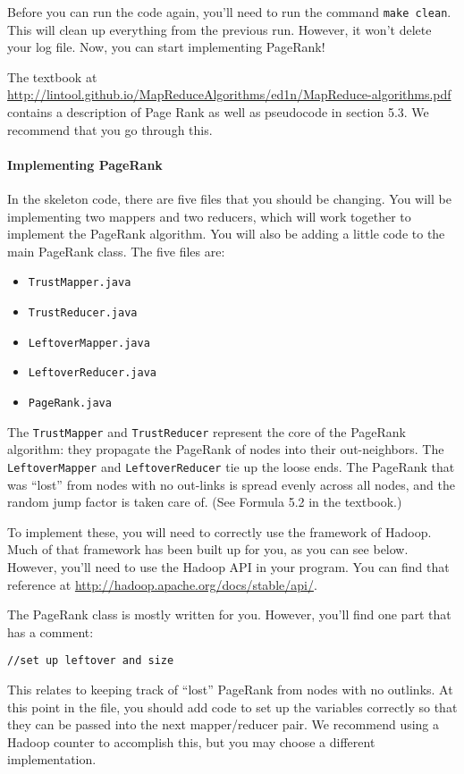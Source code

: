 \documentclass[10pt]{article}
\begin{document}
Before you can run the code again, you'll need to run the command \texttt{make clean}. This will clean up everything from the previous run. However, it won't delete your log file.
Now, you can start implementing PageRank!

The textbook at \url{http://lintool.github.io/MapReduceAlgorithms/ed1n/MapReduce-algorithms.pdf} contains a description of  Page Rank as well as pseudocode in section 5.3. We recommend that you go through this.

\paragraph{Implementing PageRank}
In the skeleton code, there are five files that you should be changing. You will be implementing two mappers and two reducers, which will work together to implement the PageRank algorithm. You will also be adding a little code to the main PageRank class. The five files are:
\begin{itemize}
	\item \texttt{TrustMapper.java}
	\item \texttt{TrustReducer.java}
	\item \texttt{LeftoverMapper.java}
	\item \texttt{LeftoverReducer.java}
	\item \texttt{PageRank.java}
\end{itemize}

The \texttt{TrustMapper} and \texttt{TrustReducer} represent the core of the PageRank algorithm: they propagate the PageRank of nodes into their out-neighbors. The \texttt{LeftoverMapper} and \texttt{LeftoverReducer} tie up the loose ends. The PageRank that was “lost” from nodes with no out-links is spread evenly across all nodes, and the random jump factor is taken care of. (See Formula 5.2 in the textbook.)

To implement these, you will need to correctly use the framework of Hadoop. Much of that framework has been built up for you, as you can see below. However, you'll need to use the Hadoop API in your program. You can find that reference at \url{http://hadoop.apache.org/docs/stable/api/}.

The PageRank class is mostly written for you. However, you'll find one part that has a comment: 

\texttt{//set up leftover and size}

This relates to keeping track of ``lost'' PageRank from nodes with no outlinks. At this point in the file, you should add code to set up the variables correctly so that they can be passed into the next mapper/reducer pair. We recommend using a Hadoop counter to accomplish this, but you may choose a different implementation.
\end{document}
